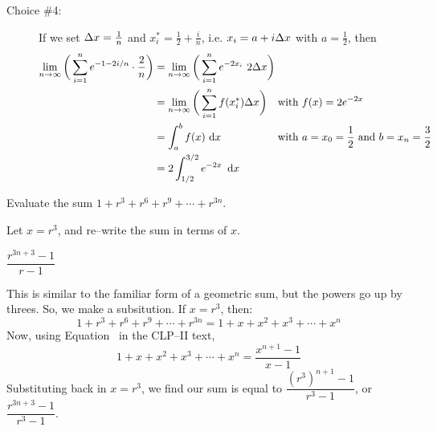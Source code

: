 \begin{solution}
\begin{description}
\item[Choice \#4:]
If we set $\Delta x = \frac{1}{n}$ and $x_i^*= \frac{1}{2}+\frac{i}{n}$, i.e. $x_i = a + i\Delta x$
with $a=\frac{1}{2}$,
then
\begin{align*}
\lim_{n\rightarrow\infty} \bigg( \sum_{i=1}^n e^{-1-2i/n}\cdot \frac{2}{n} \bigg)
&=\lim_{n\rightarrow\infty} \bigg( \sum_{i=1}^n e^{-2x_i}\ 2\De x \bigg) \hidewidth \\
&=\lim_{n\rightarrow\infty} \bigg( \sum_{i=1}^n f(x_i^*)\De x \bigg)
                       &&\text{with $f(x) = 2e^{-2x}$} \\
&=\int_a^b f(x)\,\,\dee{x}&&\text{with $a=x_0=\frac{1}{2}$ and $b=x_n=\frac{3}{2}$} \\
&=2\int_{1/2}^{3/2} e^{-2x}\ \,\dee{x}
\end{align*}

\end{description}

\end{solution}



\begin{Mquestion}\label{1.1geoma}
Evaluate the sum $1+r^3+r^6+r^9+\cdots+r^{3n}$.
\end{Mquestion}
\begin{hint}
Let $x=r^3$, and re--write the sum in terms of $x$.
\end{hint}
\begin{answer}
$\dfrac{r^{3n+3}-1}{r-1}$
\end{answer}
\begin{solution}
This is similar to the familiar form of a geometric sum, but the powers go up by threes. So, we make a subsitution. If $x=r^3$, then:
\[
1+r^3+r^6+r^9+\cdots+r^{3n}=1+x+x^2+x^3+\cdots+x^n\]
Now, using Equation~ in the CLP--II text,
\[
1+x+x^2+x^3+\cdots+x^n = \frac{x^{n+1}-1}{x-1}\]
Substituting back in $x=r^3$, we find our sum is equal to $\dfrac{(r^3)^{n+1}-1}{r^3-1}$, or
$\dfrac{r^{3n+3}-1}{r^3-1}$.
\end{solution}

